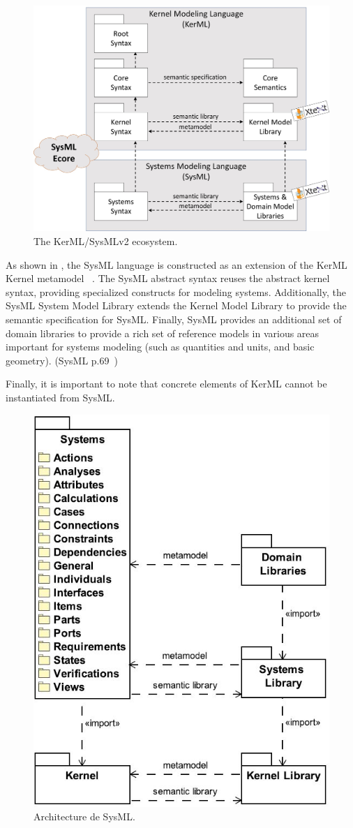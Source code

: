 \begin{figure}[ht]     
	\centering
	\includegraphics[width=.8\linewidth]{images/KerMLSysML.jpg}
	\caption{The KerML/SysMLv2 ecosystem.}
	\label{fig:kermlsysml}
\end{figure}



As shown in , the SysML language is constructed as an extension of the KerML Kernel metamodel ~\cite{kerML}. The SysML abstract syntax reuses the abstract kernel syntax, providing specialized constructs for modeling systems. Additionally, the SysML System Model Library extends the Kernel Model Library to provide the semantic specification for SysML. Finally, SysML provides an additional set of domain libraries to provide a rich set of reference models in various areas important for systems modeling (such as quantities and units, and basic geometry). (SysML p.69~\cite{sysml})

Finally, it is important to note that concrete elements of KerML cannot be instantiated from SysML.

\begin{figure}[ht]     
	\centering
	\includegraphics[width=.5\linewidth]{images/sysml.JPG}
	\caption{Architecture de SysML.}
	\label{fig:sysml}
\end{figure}

